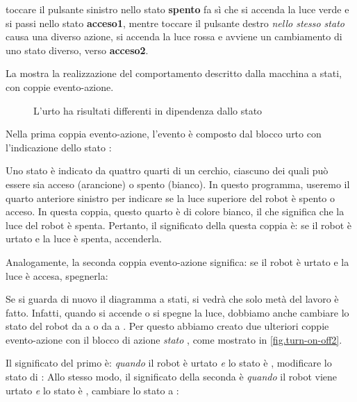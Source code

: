 toccare il pulsante sinistro nello stato \textbf{spento} fa sì che si accenda la luce verde
e si passi nello stato \textbf{acceso1}, mentre
toccare il pulsante destro \emph{nello stesso stato} causa una diverso
azione, si accenda la luce rossa e avviene un cambiamento di uno stato diverso, verso \textbf{acceso2}.


La  mostra la realizzazione del comportamento descritto dalla macchina a stati, con coppie evento-azione.


\begin{figure}
	\hfill
	\caption{L'urto ha risultati differenti in dipendenza dallo stato}
	\label{fig.turn-on-off}
\end{figure}

Nella prima coppia evento-azione, l'evento è composto dal blocco
urto con l'indicazione dello stato : 

Uno stato è indicato da quattro quarti di un cerchio, ciascuno dei quali può essere
sia acceso (arancione) o spento (bianco). In questo programma, useremo il quarto anteriore sinistro per
indicare se la luce superiore del robot è spento o acceso. In questa coppia, questo
quarto è di colore bianco, il che significa che la luce del robot è spenta.
Pertanto, il significato della questa coppia è: se il robot è urtato e la luce è spenta, accenderla.

Analogamente, la seconda coppia evento-azione significa: se il robot
è urtato e la luce è accesa, spegnerla: 

Se si guarda di nuovo il diagramma a stati, si
vedrà che solo metà del lavoro è fatto. Infatti, quando si accende o si spegne la luce, dobbiamo anche cambiare lo stato del robot da  a
 o da  a . Per questo abbiamo creato due
ulteriori coppie evento-azione con il  blocco di azione \emph{stato}
, come mostrato in \cref{fig.turn-on-off2}.

Il significato del primo è: \emph{quando}  il robot è urtato
\emph{e} lo stato è , modificare lo stato di :
Allo stesso modo, il significato della seconda è \emph{quando} il robot
viene urtato \emph{e} lo stato è , cambiare lo stato a : 

